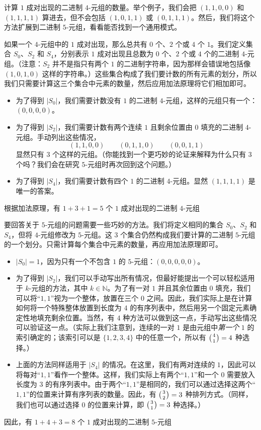 \begin{example}
    计算 $1$ 成对出现的二进制 $4$-元组的数量。举个例子，我们会把 $(1, 1, 0, 0)$ 和 $(1, 1, 1, 1)$ 算进去，但不会包括 $(1, 0, 1, 1)$ 或 $(0, 1, 1, 1)$。然后，我们将这个方法扩展到二进制 $5$-元组，看看能否找到一个通用模式。

    如果一个 $4$-元组中的 $1$ 成对出现，那么总共有 $0$ 个、$2$ 个或 $4$ 个 $1$。我们定义集合 $S_0$、$S_2$ 和 $S_4$，分别表示 $1$ 成对出现且总数为 $0$ 个、$2$ 个或 $4$ 个的二进制 $4$-元组。（注意：$S_2$ 并不是指只有两个 $1$ 的二进制字符串，因为那样会错误地包括像 $(1, 0, 1, 0)$ 这样的字符串。）这些集合构成了我们要计数的所有元素的划分，所以我们只需要计算这三个集合中元素的数量，然后应用加法原理将它们相加即可。
    \begin{itemize}
        \item 为了得到 $|S_0|$，我们需要计数没有 $1$ 的二进制 $4$-元组，这样的元组只有一个：$(0, 0, 0, 0)$。
        \item 为了得到 $|S_2|$，我们需要计数有两个连续 $1$ 且剩余位置由 $0$ 填充的二进制 $4$-元组。手动列出这些情况，
              \[(1, 1, 0, 0) \qquad (0, 1, 1, 0) \qquad (0, 0, 1, 1)\]
              显然只有 $3$ 个这样的元组。（你能找到一个更巧妙的论证来解释为什么只有 $3$ 个吗？我们会在研究 $5$-元组时再次回到这个问题。）
        \item 为了得到 $|S_4|$，我们需要计数有四个 $1$ 的二进制 $4$-元组。显然 $(1, 1, 1, 1)$ 是唯一的答案。
    \end{itemize}
    根据加法原理，有 $ 1 + 3 + 1 = 5$ 个 $1$ 成对出现的二进制 $4$-元组

    要回答关于 $5$-元组的问题需要一些巧妙的方法。我们将定义相同的集合 $S_0$、$S_2$ 和 $S_4$，但将 $4$-元组修改为 $5$-元组。这 $3$ 个集合仍然构成我们要计算的二进制 $5$-元组的一个划分。只需计算每个集合中元素的数量，再应用加法原理即可。
    \begin{itemize}
        \item $|S_0|=1$，因为只有一个不包含 $1$ 的 $5$-元组：$(0, 0, 0, 0, 0)$。
        \item 为了得到 $|S_2|$，我们可以手动写出所有情况，但最好能提出一个可以轻松适用于 $k$-元组的方法，其中 $k \in \mathbb{N}$。为了有一对 $1$ 并且其余位置由 $0$ 填充，我们可以将``$1, 1$''视为一个整体，放置在三个 $0$ 之间。因此，我们实际上是在计算如何将一个特殊整体放置到长度为 $4$ 的有序列表中，然后用另一个固定元素确定性地填充剩余位置。当然，有 $4$ 种方法可以做到这一点，手动写出这些情况可以验证这一点。（实际上我们注意到，连续的一对 $1$ 是由元组中\emph{第一个} $1$ 的索引确定的；该索引可以是 $\{1, 2, 3, 4\}$ 中的任意一个，所以有 $\big({4 \atop 1}\big) = 4$ 种选择。）
        \item 上面的方法同样适用于 $|S_4|$ 的情况。在这里，我们有两对连续的 $1$，因此可以将每对``$1,1$''看作一个整体。这样，我们实际上有两个``$1,1$''和一个 $0$ 需要放入长度为 $3$ 的有序列表中。由于两个``$1,1$''是相同的，我们可以通过选择这两个``$1,1$''的位置来计算有序列表的数量。因此，有 $\big({3 \atop 2}\big) = 3$ 种排列方式。（同样，我们也可以通过选择 $0$ 的位置来计算，即 $\big({3 \atop 1}\big) = 3$ 种选择。）
    \end{itemize}
    因此，有 $1 + 4 + 3 = 8$ 个 $1$ 成对出现的二进制 $5$-元组
\end{example}

